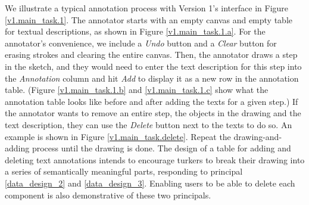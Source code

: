 We illustrate a typical annotation process with Version 1's interface in Figure \ref{v1.main_task.1}. 
The annotator starts with an empty canvas and empty table for textual descriptions, as shown in Figure \ref{v1.main_task.1.a}. For the annotator's convenience, we include a \textit{Undo} button and a \textit{Clear} button for erasing strokes and clearing the entire canvas.  
Then, the annotator draws a step in the sketch, and they would need to enter the text description for this step into the \textit{Annotation} column and hit \textit{Add} to display it as a new row in the annotation table. (Figure \ref{v1.main_task.1.b} and \ref{v1.main_task.1.c} show what the annotation table looks like before and after adding the texts for a given step.) If the annotator wants to remove an entire step, the objects in the drawing and the text description, they can use the \textit{Delete} button next to the texts to do so. An example is shown in Figure \ref{v1.main_task.delete}.
Repeat the drawing-and-adding process until the drawing is done. 
The design of a table for adding and deleting text annotations intends to encourage turkers to break their drawing into a series of semantically meaningful parts, responding to principal \ref{data_design_2} and \ref{data_design_3}.  Enabling users to be able to delete each component is also demonstrative of these two principals. 


